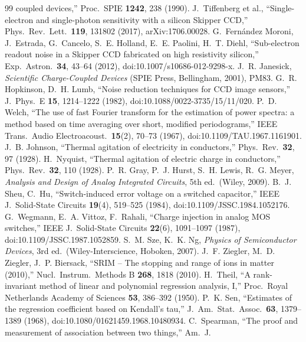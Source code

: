 \documentclass[10pt,a4paper]{article}
\begin{document}
\begin{thebibliography}{99}
coupled devices,'' Proc.\ SPIE \textbf{1242}, 238 (1990).
 J.~Tiffenberg et al., ``Single-electron and single-photon sensitivity with a silicon Skipper
CCD,'' Phys.\ Rev.\ Lett.\ \textbf{119}, 131802 (2017), arXiv:1706.00028.
 G.~Fern\'andez Moroni, J.~Estrada, G.~Cancelo, S.~E. Holland, E.~E. Paolini, H.~T. Diehl,
``Sub-electron readout noise in a Skipper CCD fabricated on high resistivity silicon,'' Exp.\ Astron.\ \textbf{34},
43--64 (2012), doi:10.1007/s10686-012-9298-x.
 J.~R. Janesick, \emph{Scientific Charge-Coupled Devices} (SPIE Press, Bellingham, 2001), PM83.
 G.~R. Hopkinson, D.~H. Lumb, ``Noise reduction techniques for CCD image sensors,'' J.\ Phys.\ E
\textbf{15}, 1214--1222 (1982), doi:10.1088/0022-3735/15/11/020.
 P.~D. Welch, ``The use of fast Fourier transform for the estimation of power spectra: a method based
on time averaging over short, modified periodograms,'' IEEE Trans.\ Audio Electroacoust.\ \textbf{15}(2), 70--73
(1967), doi:10.1109/TAU.1967.1161901.
 J.~B. Johnson, ``Thermal agitation of electricity in conductors,'' Phys.\ Rev.\ \textbf{32}, 97
(1928).
 H.~Nyquist, ``Thermal agitation of electric charge in conductors,'' Phys.\ Rev.\ \textbf{32}, 110
(1928).
 P.~R. Gray, P.~J. Hurst, S.~H. Lewis, R.~G. Meyer, \emph{Analysis and Design of Analog Integrated
Circuits}, 5th ed.\ (Wiley, 2009).
 B.~J. Sheu, C.~Hu, ``Switch-induced error voltage on a switched capacitor,'' IEEE J.\ Solid-State
Circuits \textbf{19}(4), 519--525 (1984), doi:10.1109/JSSC.1984.1052176.
 G.~Wegmann, E.~A. Vittoz, F.~Rahali, ``Charge injection in analog MOS switches,'' IEEE J.\
Solid-State Circuits \textbf{22}(6), 1091--1097 (1987), doi:10.1109/JSSC.1987.1052859.
\bibitem{sze} S.~M. Sze, K.~K. Ng, \emph{Physics of Semiconductor Devices}, 3rd ed.\ (Wiley-Interscience, Hoboken,
2007).
 J.~F. Ziegler, M.~D. Ziegler, J.~P. Biersack, ``SRIM -- The stopping and range of ions in matter
(2010),'' Nucl.\ Instrum.\ Methods B \textbf{268}, 1818 (2010).
 H.~Theil, ``A rank-invariant method of linear and polynomial regression analysis, I,'' Proc.\ Royal
Netherlands Academy of Sciences \textbf{53}, 386--392 (1950).
 P.~K. Sen, ``Estimates of the regression coefficient based on Kendall's tau,'' J.\ Am.\ Stat.\ Assoc.\
\textbf{63}, 1379--1389 (1968), doi:10.1080/01621459.1968.10480934.
\bibitem{spearman1904} C.~Spearman, ``The proof and measurement of association between two things,'' Am.\ J.\

\end{thebibliography}
\end{document}

